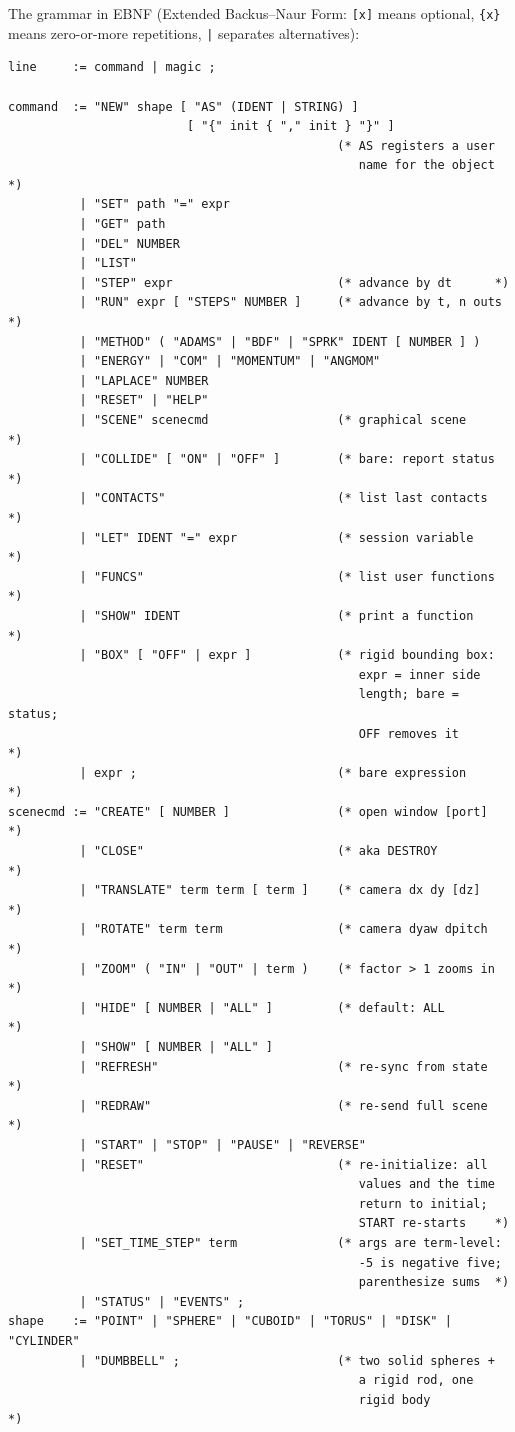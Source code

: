\documentclass[11pt]{article}
\newcommand{\code}[1]{\texttt{#1}}
\begin{document}
The grammar in EBNF (Extended Backus--Naur Form: \code{[x]} means
optional, \code{\{x\}} means zero-or-more repetitions, \code{|} separates
alternatives):

\begin{lstlisting}
line     := command | magic ;

command  := "NEW" shape [ "AS" (IDENT | STRING) ]
                         [ "{" init { "," init } "}" ]
                                              (* AS registers a user
                                                 name for the object *)
          | "SET" path "=" expr
          | "GET" path
          | "DEL" NUMBER
          | "LIST"
          | "STEP" expr                       (* advance by dt      *)
          | "RUN" expr [ "STEPS" NUMBER ]     (* advance by t, n outs *)
          | "METHOD" ( "ADAMS" | "BDF" | "SPRK" IDENT [ NUMBER ] )
          | "ENERGY" | "COM" | "MOMENTUM" | "ANGMOM"
          | "LAPLACE" NUMBER
          | "RESET" | "HELP"
          | "SCENE" scenecmd                  (* graphical scene     *)
          | "COLLIDE" [ "ON" | "OFF" ]        (* bare: report status *)
          | "CONTACTS"                        (* list last contacts  *)
          | "LET" IDENT "=" expr              (* session variable    *)
          | "FUNCS"                           (* list user functions *)
          | "SHOW" IDENT                      (* print a function    *)
          | "BOX" [ "OFF" | expr ]            (* rigid bounding box:
                                                 expr = inner side
                                                 length; bare = status;
                                                 OFF removes it      *)
          | expr ;                            (* bare expression     *)
scenecmd := "CREATE" [ NUMBER ]               (* open window [port]  *)
          | "CLOSE"                           (* aka DESTROY         *)
          | "TRANSLATE" term term [ term ]    (* camera dx dy [dz]   *)
          | "ROTATE" term term                (* camera dyaw dpitch  *)
          | "ZOOM" ( "IN" | "OUT" | term )    (* factor > 1 zooms in *)
          | "HIDE" [ NUMBER | "ALL" ]         (* default: ALL        *)
          | "SHOW" [ NUMBER | "ALL" ]
          | "REFRESH"                         (* re-sync from state  *)
          | "REDRAW"                          (* re-send full scene  *)
          | "START" | "STOP" | "PAUSE" | "REVERSE"
          | "RESET"                           (* re-initialize: all
                                                 values and the time
                                                 return to initial;
                                                 START re-starts    *)
          | "SET_TIME_STEP" term              (* args are term-level:
                                                 -5 is negative five;
                                                 parenthesize sums  *)
          | "STATUS" | "EVENTS" ;
shape    := "POINT" | "SPHERE" | "CUBOID" | "TORUS" | "DISK" | "CYLINDER"
          | "DUMBBELL" ;                      (* two solid spheres +
                                                 a rigid rod, one
                                                 rigid body          *)


\end{lstlisting}
\end{document}
